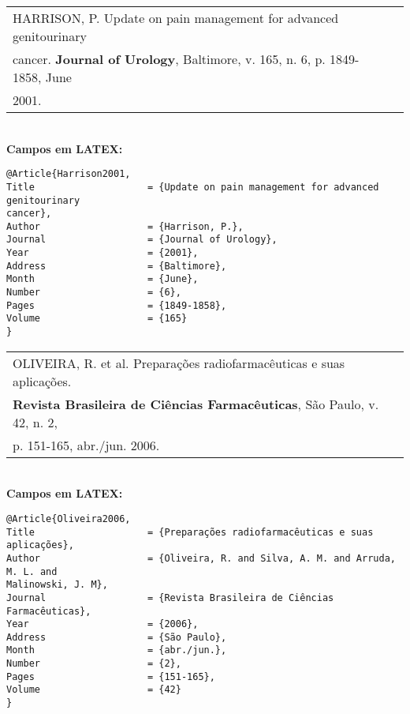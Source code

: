 \begin{tabular}{|l|c|} \hline
	HARRISON, P. Update on pain management for advanced genitourinary \\cancer. \textbf{Journal of Urology}, Baltimore, v. 165, n. 6, p. 1849-1858, June \\2001. 
	                                                                  \\\hline
\end{tabular} \\
	
\textbf{Campos em LATEX:} 
	
\begingroup
\fontsize{10pt}{12pt}\selectfont
\begin{verbatim}
@Article{Harrison2001,
Title                    = {Update on pain management for advanced 
genitourinary 
cancer},
Author                   = {Harrison, P.},
Journal                  = {Journal of Urology},
Year                     = {2001},
Address                  = {Baltimore},
Month                    = {June},
Number                   = {6},
Pages                    = {1849-1858},
Volume                   = {165}
}
\end{verbatim}
\endgroup
	
\begin{tabular}{|l|c|} \hline
	OLIVEIRA, R. et al. Preparações radiofarmacêuticas e suas aplicações.        \\
	\textbf{Revista Brasileira de Ciências Farmacêuticas}, São Paulo, v. 42, n. 2, \\
	p. 151-165, abr./jun. 2006.                                                       \\\hline
\end{tabular} \\
	
\textbf{Campos em LATEX:} 
	
\begingroup
\fontsize{10pt}{12pt}\selectfont
\begin{verbatim}
@Article{Oliveira2006,
Title                    = {Preparações radiofarmacêuticas e suas 
aplicações},
Author                   = {Oliveira, R. and Silva, A. M. and Arruda, 
M. L. and 
Malinowski, J. M},
Journal                  = {Revista Brasileira de Ciências Farmacêuticas},
Year                     = {2006},
Address                  = {São Paulo},
Month                    = {abr./jun.},
Number                   = {2},
Pages                    = {151-165},
Volume                   = {42}
}\end{verbatim}
\endgroup


